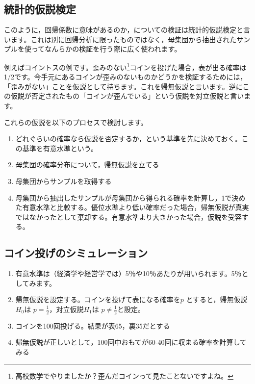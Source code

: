 \documentclass[
  letterpaper,
  DIV=11,
  numbers=noendperiod]{scrreprt}
\providecommand{\tightlist}{%
  \setlength{\itemsep}{0pt}\setlength{\parskip}{0pt}}\usepackage{longtable,booktabs,array}
\begin{document}
\hypertarget{ux7d71ux8a08ux7684ux4eeeux8aacux691cux5b9a}{%
\subsection{統計的仮説検定}\label{ux7d71ux8a08ux7684ux4eeeux8aacux691cux5b9a}}

このように，回帰係数に意味があるのか，についての検証は統計的仮説検定と言います。これは別に回帰分析に限ったものではなく，母集団から抽出されたサンプルを使ってなんらかの検証を行う際に広く使われます。

例えばコイントスの例です。歪みのない\footnote{高校数学でやりましたか？歪んだコインって見たことないですよね。}コインを投げた場合，表が出る確率は1/2です。今手元にあるコインが歪みのないものかどうかを検証するためには，「歪みがない」ことを仮説として持ちます。これを帰無仮説と言います。逆にこの仮説が否定されたもの「コインが歪んでいる」という仮説を対立仮説と言います。

これらの仮説を以下のプロセスで検討します。

\begin{enumerate}
\def\labelenumi{\arabic{enumi}.}
\tightlist
\item
  どれぐらいの確率なら仮説を否定するか，という基準を先に決めておく。この基準を有意水準という。
\item
  母集団の確率分布について，帰無仮説を立てる
\item
  母集団からサンプルを取得する
\item
  母集団から抽出したサンプルが母集団から得られる確率を計算し，1で決めた有意水準と比較する。優位水準より低い確率だった場合，帰無仮説が真実ではなかったとして棄却する。有意水準より大きかった場合，仮説を受容する。
\end{enumerate}

\hypertarget{ux30b3ux30a4ux30f3ux6295ux3052ux306eux30b7ux30dfux30e5ux30ecux30fcux30b7ux30e7ux30f3}{%
\subsection{コイン投げのシミュレーション}\label{ux30b3ux30a4ux30f3ux6295ux3052ux306eux30b7ux30dfux30e5ux30ecux30fcux30b7ux30e7ux30f3}}

\begin{enumerate}
\def\labelenumi{\arabic{enumi}.}
\tightlist
\item
  有意水準は（経済学や経営学では）5％や10％あたりが用いられます。5％としてみます。
\item
  帰無仮説を設定する。コインを投げて表になる確率を\(p\)
  とすると，帰無仮説\(H_0\)は \(p = \frac{1}{2}\)，対立仮説\(H_1\)は
  \(p \ne \frac{1}{2}\)と設定。
\item
  コインを100回投げる。結果が表65，裏35だとする
\item
  帰無仮説が正しいとして，100回中おもてが60-40回に収まる確率を計算してみる
\end{enumerate}
\end{document}
